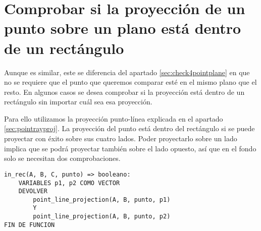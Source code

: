 \section{Comprobar si la proyección de un punto sobre un plano está dentro de un rectángulo}
\label{in_rec}
Aunque es similar, este se diferencia del apartado \ref{sec:check4pointplane} en que no se requiere que el punto que queremos comparar esté en el mismo plano que el resto. En algunos casos se desea comprobar si la proyección está dentro de un rectángulo sin importar cuál sea esa proyección.

Para ello utilizamos la proyección punto-línea explicada en el apartado \ref{sec:pointrayproj}. La proyección del punto está dentro del rectángulo si se puede proyectar con éxito sobre sus cuatro lados. Poder proyectarlo sobre un lado implica que se podrá proyectar también sobre el lado opuesto, así que en el fondo solo se necesitan dos comprobaciones.

\begin{lstlisting}
in_rec(A, B, C, punto) => booleano:
    VARIABLES p1, p2 COMO VECTOR
    DEVOLVER
        point_line_projection(A, B, punto, p1) 
        Y 
        point_line_projection(A, B, punto, p2)
FIN DE FUNCION
\end{lstlisting}
